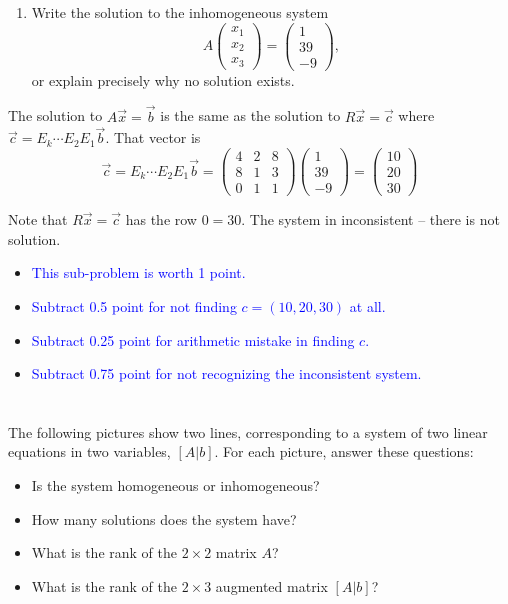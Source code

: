 \documentclass[10pt,twoside]{article}
\begin{document}
\begin{enumerate}
\item 
{\color{red}Write the solution to the inhomogeneous system 
\[ A \begin{pmatrix}
x_1 \\ x_2 \\ x_3
\end{pmatrix} =  \begin{pmatrix}1 \\ 39 \\ -9\end{pmatrix},\]
or explain precisely why no solution exists.
}
\end{enumerate}

The solution to $A\vec{x}=\vec{b}$ is the same as the solution to $R \vec{x} =
\vec{c}$ where $\vec{c} = 
E_k\cdots E_2E_1 \vec{b}$.  That vector is
\[ 
\vec{c} = E_k \cdots E_2 E_1\vec{b} 
=
 \begin{pmatrix}
4 & 2 & 8\\
8 & 1 & 3\\
0 & 1 & 1
\end{pmatrix}
\begin{pmatrix}1 \\ 39 \\ -9\end{pmatrix}
=
\begin{pmatrix}
10 \\ 20 \\ 30 
\end{pmatrix}\]

Note that $R\vec{x} = \vec{c}$ has the row $0 = 30$.  The system in
inconsistent -- there is not solution.

\begin{itemize}
\item\textcolor{blue}{This sub-problem is worth 1 point.}
\item\textcolor{blue}{Subtract 0.5 point for not finding $c = (10,20,30)$ at
all.}
\item\textcolor{blue}{Subtract 0.25 point for arithmetic mistake in finding
$c$.}
\item\textcolor{blue}{Subtract 0.75 point for not recognizing the inconsistent
system.}
\end{itemize}


\section{ }
{\color{red}The following pictures show two lines, corresponding to a system of two linear equations
in two variables, $[A|b]$.
For each picture, answer these questions:}
\begin{itemize}
\item {\color{red}Is the system homogeneous or inhomogeneous?}
\item {\color{red}How many solutions does the system have?}
\item {\color{red}What is the rank of the $2 \times 2$ matrix $A$?}
\item {\color{red}What is the rank of the $2 \times 3$ augmented matrix $[A|b]$?}
\end{itemize} 
\end{document}
